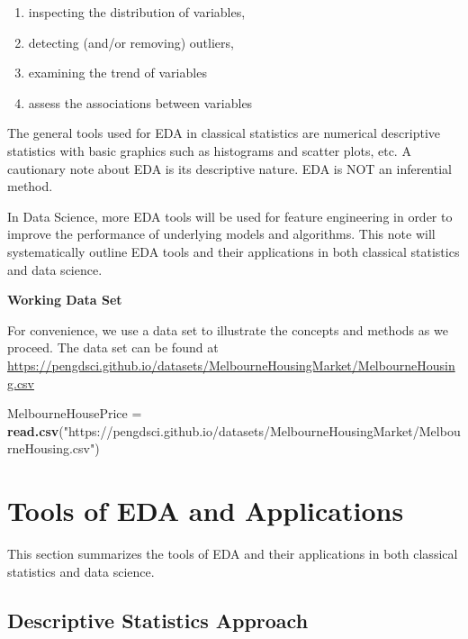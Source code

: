 \documentclass[
]{book}
\newenvironment{Shaded}{\begin{snugshade}}{\end{snugshade}}
\newcommand{\FunctionTok}[1]{\textcolor[rgb]{0.13,0.29,0.53}{\textbf{#1}}}
\newcommand{\NormalTok}[1]{#1}
\newcommand{\OtherTok}[1]{\textcolor[rgb]{0.56,0.35,0.01}{#1}}
\newcommand{\StringTok}[1]{\textcolor[rgb]{0.31,0.60,0.02}{#1}}
\begin{document}
\begin{enumerate}
\def\labelenumi{\arabic{enumi}.}
\item
  inspecting the distribution of variables,
\item
  detecting (and/or removing) outliers,
\item
  examining the trend of variables
\item
  assess the associations between variables
\end{enumerate}

The general tools used for EDA in classical statistics are numerical descriptive statistics with basic graphics such as histograms and scatter plots, etc. A cautionary note about EDA is its descriptive nature. EDA is NOT an inferential method.

In Data Science, more EDA tools will be used for feature engineering in order to improve the performance of underlying models and algorithms. This note will systematically outline EDA tools and their applications in both classical statistics and data science.

\textbf{Working Data Set}

For convenience, we use a data set to illustrate the concepts and methods as we proceed. The data set can be found at \url{https://pengdsci.github.io/datasets/MelbourneHousingMarket/MelbourneHousing.csv}

\begin{Shaded}
\begin{Highlighting}[]
\NormalTok{MelbourneHousePrice }\OtherTok{=} \FunctionTok{read.csv}\NormalTok{(}\StringTok{"https://pengdsci.github.io/datasets/MelbourneHousingMarket/MelbourneHousing.csv"}\NormalTok{)}
\end{Highlighting}
\end{Shaded}

\hypertarget{tools-of-eda-and-applications}{%
\section{Tools of EDA and Applications}\label{tools-of-eda-and-applications}}

This section summarizes the tools of EDA and their applications in both classical statistics and data science.

\hypertarget{descriptive-statistics-approach}{%
\subsection{Descriptive Statistics Approach}\label{descriptive-statistics-approach}}
\end{document}
